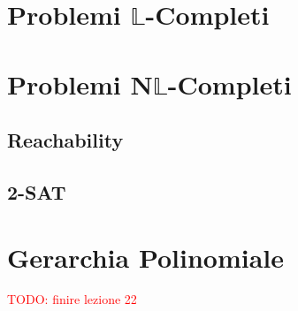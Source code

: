 \section{Problemi $\mathbb{L}$-Completi}





\section{Problemi N$\mathbb{L}$-Completi}

\subsection{Reachability}


\subsection{2-SAT}





\section{Gerarchia Polinomiale}


\textcolor{Red}{TODO: finire lezione 22}